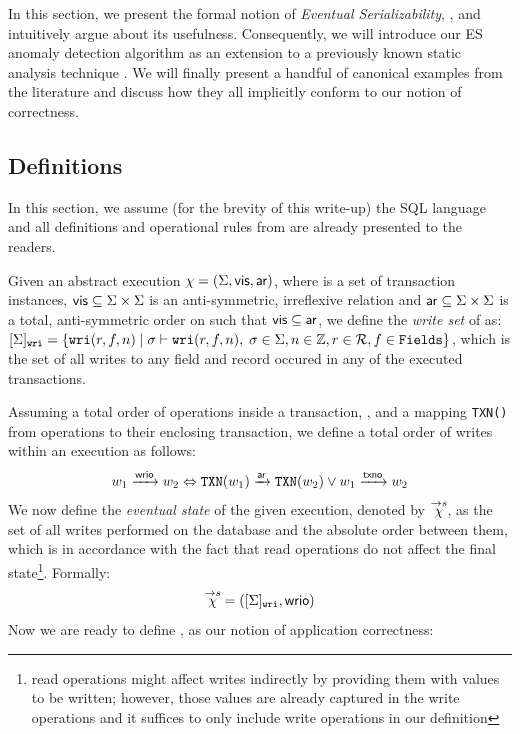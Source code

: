 In this section, we present the formal notion of \emph{Eventual
Serializability}, \es, and intuitively argue about its usefulness. Consequently, we
will introduce our ES anomaly detection algorithm as an extension to a previously known static
analysis technique \cite{Nagar:ser}. We will finally
present a handful of canonical examples from the literature and discuss how they all
implicitly conform to our notion of correctness.

\subsection {Definitions}
In this section, we assume (for the brevity of this
write-up) the SQL language and all definitions and operational rules from \cite{Nagar:ser}
are already presented to the readers. 

Given an abstract execution $ \chi = (\Sigma, \mathsf{vis}, \mathsf{ar})$, where \txns is a set of 
transaction instances, $\mathsf{vis} \subseteq \Sigma \times \Sigma$ is an anti-symmetric, irreflexive relation
and $\mathsf{ar} \subseteq \Sigma \times \Sigma $ is a total, anti-symmetric
order on \txns such that $\mathsf{vis} \subseteq \mathsf{ar}$, we define the \emph{write
set} of \txns as:
$ [\Sigma]_{\texttt{wri}} = \{\texttt{wri}(r,f,n) \;|\; \sigma \vdash
  \texttt{wri}(r,f,n),\;
\sigma \in \Sigma, n \in \mathbb{Z}, r \in \mathcal{R}, f \in \texttt{Fields}  \} $, which is
the set of all writes to any field and record occured in any of the
executed transactions.

Assuming a total order of operations inside a transaction, \txno, and
a mapping \texttt{TXN()} from operations to their enclosing
transaction, we define a total order of writes within an execution as
follows: 
$$ w_1 \xrightarrow{\mathsf{wrio}} w_2  \Leftrightarrow \texttt{TXN}(w_1)
\xrightarrow{\mathsf{ar}} \texttt{TXN}(w_2)  \vee w_1 \xrightarrow{\mathsf{txno}} w_2$$
We now define the \emph{eventual state} of the given execution,
denoted by $\overset{\rightarrow s}{\chi}$, as the set of all writes performed on the database
and the absolute order between them, which is in accordance with the
fact that read operations do not affect the final state\footnote{read operations might 
affect writes indirectly by
providing them with values to be written; however, those values are already
captured in the write operations and it suffices to only include
write operations in our definition}. Formally:
  $$\overset{\rightarrow s}{\chi} = ([\Sigma]_{\texttt{wri}},\mathsf{wrio}) $$
Now we are ready to define \es, as our notion of application
correctness:

